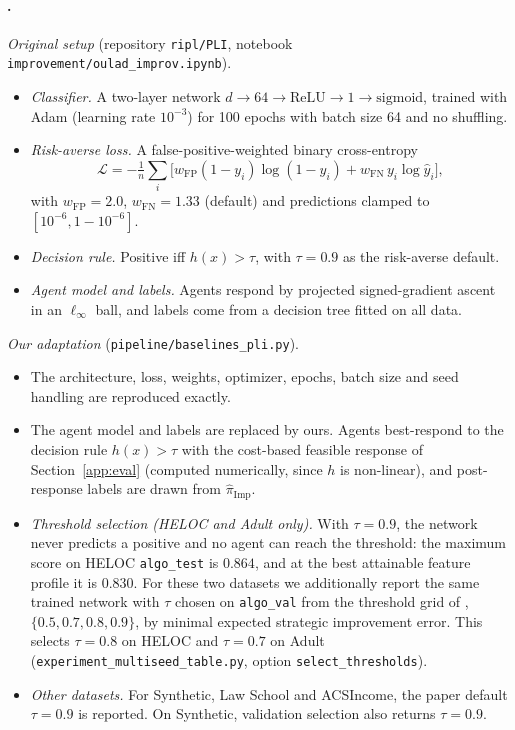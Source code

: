\paragraph{\citet{attias2025pac}.}
\emph{Original setup} (repository \texttt{ripl/PLI}, notebook
\texttt{improvement/oulad\_improv.ipynb}).
\begin{itemize}
  \item \emph{Classifier.} A two-layer network
        $d\!\to\!64\!\to\!\mathrm{ReLU}\!\to\!1\!\to\!\mathrm{sigmoid}$,
        trained with Adam (learning rate $10^{-3}$) for 100 epochs with batch size
        64 and no shuffling.
  \item \emph{Risk-averse loss.} A false-positive-weighted binary cross-entropy
        \[
          \mathcal{L}=-\tfrac{1}{n}\sum_i\big[w_{\mathrm{FP}}(1-y_i)\log(1-\hat y_i)
          +w_{\mathrm{FN}}\,y_i\log\hat y_i\big],
        \]
        with $w_{\mathrm{FP}}=2.0$, $w_{\mathrm{FN}}=1.33$ (default) and
        predictions clamped to $[10^{-6},1-10^{-6}]$.
  \item \emph{Decision rule.} Positive iff $h(x)>\tau$, with $\tau=0.9$ as the
        risk-averse default.
  \item \emph{Agent model and labels.} Agents respond by projected signed-gradient
        ascent in an $\ell_\infty$ ball, and labels come from a decision tree
        fitted on all data.
\end{itemize}
\emph{Our adaptation} (\texttt{pipeline/baselines\_pli.py}).
\begin{itemize}
  \item The architecture, loss, weights, optimizer, epochs, batch size and seed
        handling are reproduced exactly.
  \item The agent model and labels are replaced by ours. Agents best-respond to
        the decision rule $h(x)>\tau$ with the cost-based feasible response of
        Section~\ref{app:eval} (computed numerically, since $h$ is non-linear),
        and post-response labels are drawn from $\widehat{\pi}_{\mathrm{Imp}}$.
  \item \emph{Threshold selection (HELOC and Adult only).} With $\tau=0.9$, the
        network never predicts a positive and no agent can reach the threshold:
        the maximum score on HELOC \texttt{algo\_test} is $0.864$, and at the
        best attainable feature profile it is $0.830$. For these two datasets we
        additionally report the same trained network with $\tau$ chosen on
        \texttt{algo\_val} from the threshold grid of \citet{attias2025pac},
        $\{0.5,0.7,0.8,0.9\}$, by minimal expected strategic improvement error.
        This selects $\tau=0.8$ on HELOC and $\tau=0.7$ on Adult
        (\texttt{experiment\_multiseed\_table.py}, option
        \texttt{select\_thresholds}).
  \item \emph{Other datasets.} For Synthetic, Law School and ACSIncome, the
        paper default $\tau=0.9$ is reported. On Synthetic, validation selection
        also returns $\tau=0.9$.
\end{itemize}

